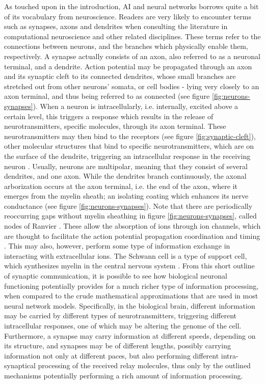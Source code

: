 As touched upon in the introduction, AI and neural networks borrows quite a bit of its vocabulary from neuroscience. Readers are very likely to encounter terms such as synapses, axons and dendrites when consulting the literature in computational neuroscience and other related disciplines. These terms refer to the connections between neurons, and the branches which physically enable them, respectively. A synapse actually consists of an axon, also referred to as a neuronal terminal, and a dendrite. Action potential may be propagated through an axon and its synaptic cleft to its connected dendrites, whose small branches are stretched out from other neurons' somata, or cell bodies - lying very closely to an axon terminal, and thus being referred to as connected (see figure \ref{fig:neurons-synapses}). When a neuron is intracellularly, i.e. internally, excited above a certain level, this triggers a response which results in the release of neurotransmitters, specific molecules, through its axon terminal. These neurotransmitters may then bind to the receptors (see figure \ref{fig:synaptic-cleft}), other molecular structures that bind to specific neurotransmitters, which are on the surface of the dendrite, triggering an intracellular response in the receiving neuron \citep{Campbell2015chpt9}.
Usually, neurons are multipolar, meaning that they consist of several dendrites, and one axon. While the dendrites branch continuously, the axonal arborization occurs at the axon terminal, i.e. the end of the axon, where it emerges from the myelin sheath; an isolating coating which enhances its nerve conductance (see figure \ref{fig:neurons-synapses}). Note that there are periodically reoccurring gaps without myelin sheathing in figure \ref{fig:neurons-synapses}, called nodes of Ranvier \citep{Byrne2014chpt1p11}. These allow the absorption of ions through ion channels, which are thought to facilitate the action potential propagation coordination and timing \citep{Byrne2014chpt2p26}. This may also, however, perform some type of information exchange in interacting with extracellular ions. The Schwann cell is a type of support cell, which synthesizes myelin in the central nervous system \citep{Byrne2014chpt1p11}.
From this short outline of synaptic communication, it is possible to see how biological neuronal functioning potentially provides for a much richer type of information processing, when compared to the crude mathematical approximations that are used in most neural network models. Specifically, in the biological brain, different information may be carried by different types of neurotransmitters, triggering different intracellular responses, one of which may be altering the genome of the cell. Furthermore, a synapse may carry information at different speeds, depending on its structure, and synapses may be of different lengths, possibly carrying information not only at different paces, but also performing different intra-synaptical processing of the received relay molecules, thus only by the outlined mechanisms potentially performing a rich amount of information processing.

